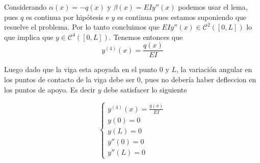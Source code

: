 \documentclass[a4paper,oneside,10.5pt]{USMArt}
\begin{document}
\begin{sol}
  Considerando $\alpha(x) = -q(x)$ y $\beta(x) = EIy''(x)$ podemos usar el lema,
  pues $q$ es continua por hipótesis e $y$ es continua pues estamos suponiendo que resuelve el problema. Por lo tanto
  concluimos que $EIy''(x) \in \mathcal{C}^{2}([0, L])$ lo que implica que $y \in \mathcal{C}^{4}([0, L])$. Tenemos
  entonces que
  \begin{equation*}
    y^{(4)}(x) = \frac{q(x)}{EI}
  \end{equation*}

  Luego dado que la viga esta apoyada en el punto $0$ y $L$, la variación angular en los puntos de contacto de la
  viga debe ser $0$, pues no debería haber defleccion en los puntos de apoyo. Es decir $y$ debe satisfacer lo siguiente

  \begin{equation*}
    \begin{cases}
      y^{(4)}(x) = \frac{q(x)}{EI}\\
      y(0) = 0\\
      y(L) = 0\\
      y''(0) = 0\\
      y''(L) = 0
    \end{cases}
  \end{equation*}
\end{sol}
\end{document}
